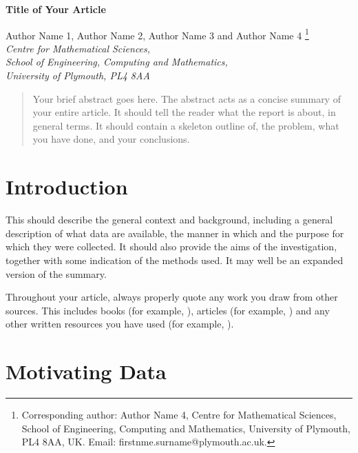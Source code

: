 \documentclass[a4paper,amsmath, 12pt]{article}
\begin{document}
\begin{center}
\textbf{\Large Title of Your Article}

\vspace{0.5cm}

Author Name 1, Author Name 2,  Author Name 3 and Author Name 4 \footnote[1]{Corresponding author: Author Name 4, Centre for Mathematical Sciences, School of Engineering, Computing and Mathematics, University of Plymouth, PL4 8AA, UK. Email: firstnme.surname@plymouth.ac.uk.} \\

{\it Centre for Mathematical Sciences, \\ School of Engineering, Computing and Mathematics, \\ University of Plymouth, PL4 8AA}
\end{center}


\begin{abstract}
\noindent
Your brief abstract goes here. The abstract acts as a concise summary of your entire article. It should tell the reader what the report is about, in general terms. It should contain a skeleton
outline of,  the problem, what you have done, and your conclusions. 


\end{abstract}


\section{Introduction}
This should describe the general context and background, including a general
description of what data are available, the manner in which and the purpose for
which they were collected.  It should also provide the aims of the investigation,
together with some indication of the methods used. It may well be an expanded
version of the summary.

Throughout your article, always properly quote any work you draw from other sources. This includes books (for example, \cite{james:2013} ), articles (for example, \cite{Seiichiro:2011}) and any other written resources you have used (for example, \cite{ONS}). \\

\section{Motivating Data}
\end{document}
